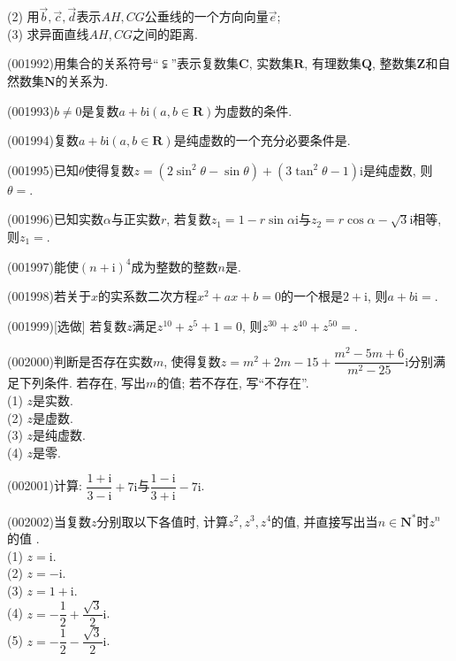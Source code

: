 (2) 用$\overrightarrow{b},\overrightarrow{c},\overrightarrow{d}$表示$AH,CG$公垂线的一个方向向量$\overrightarrow{e}$;\\ 
(3) 求异面直线$AH,CG$之间的距离.
\item (001992)用集合的关系符号``$\subsetneqq$''表示复数集$\mathbf{C}$, 实数集$\mathbf{R}$, 有理数集$\mathbf{Q}$,
整数集$\mathbf{Z}$和自然数集$\mathbf{N}$的关系为.
\item (001993)$b\neq 0$是复数$a+b\mathrm{i}(a,b\in \mathbf{R})$为虚数的条件.
\item (001994)复数$a+b\mathrm{i}(a,b\in \mathbf{R})$是纯虚数的一个充分必要条件是.
\item (001995)已知$\theta$使得复数$z=(2\sin^2\theta-\sin\theta)+(3\tan^2\theta-1)\mathrm{i}$是纯虚数, 则$\theta=$.
\item (001996)已知实数$\alpha$与正实数$r$, 若复数$z_1=1-r\sin\alpha \mathrm{i}$与$z_2=r\cos\alpha-\sqrt{3}\mathrm{i}$相等, 则$z_1=$.
\item (001997)能使$(n+\mathrm{i})^4$成为整数的整数$n$是.
\item (001998)若关于$x$的实系数二次方程$x^2+ax+b=0$的一个根是$2+\mathrm{i}$, 则$a+b\mathrm{i}=$.
\item (001999)[选做]
若复数$z$满足$z^{10}+z^5+1=0$, 则$z^{30}+z^{40}+z^{50}=$.
\item (002000)判断是否存在实数$m$, 使得复数$z=m^2+2m-15+\dfrac{m^2-5m+6}{m^2-25}\mathrm{i}$分别满足下列条件.
若存在, 写出$m$的值; 若不存在, 写``不存在''.\\ 
(1) $z$是实数.\\ 
(2) $z$是虚数.\\ 
(3) $z$是纯虚数.\\ 
(4) $z$是零.
\item (002001)计算: $\dfrac{1+\mathrm{i}}{3-\mathrm{i}}+7\mathrm{i}$与$\dfrac{1-\mathrm{i}}{3+\mathrm{i}}-7\mathrm{i}$.
\item (002002)当复数$z$分别取以下各值时, 计算$z^2,z^3,z^4$的值, 并直接写出当$n\in\mathbf{N}^*$时$z^n$的值 .\\ 
(1) $z=\mathrm{i}$.\\ 
(2) $z=-\mathrm{i}$.\\ 
(3) $z=1+\mathrm{i}$.\\ 
(4) $z=-\dfrac{1}{2}+\dfrac{\sqrt{3}}{2}\mathrm{i}$.\\ 
(5) $z=-\dfrac{1}{2}-\dfrac{\sqrt{3}}{2}\mathrm{i}$.
